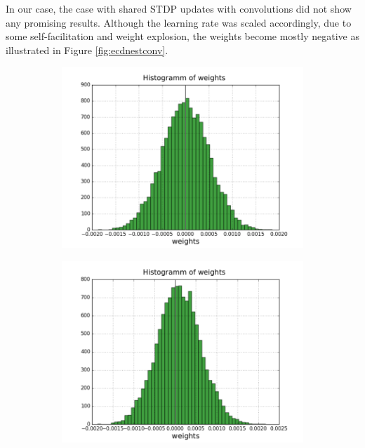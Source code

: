 In our case, the case with shared STDP updates with convolutions did not show any promising results. Although the learning rate was scaled accordingly, due to some self-facilitation and weight explosion, the weights become mostly negative as illustrated in Figure \ref{fig:ecdnestconv}.


 \begin{figure}[h!]
	\centering
	\begin{subfigure}[t]{.24\textwidth}
  		\centering
  		\includegraphics[width=.9\linewidth]{imgs/app/nest/w_hist_conv1.png}
  		\caption{}
  		\label{fig:sub1}
	\end{subfigure}%
	\begin{subfigure}[t]{.24\textwidth}
  		\centering
  		\includegraphics[width=.9\linewidth]{imgs/app/nest/w_hist_conv2.png}
  		\caption{}
  		\label{fig:sub2}
	\end{subfigure}

\end{figure}

